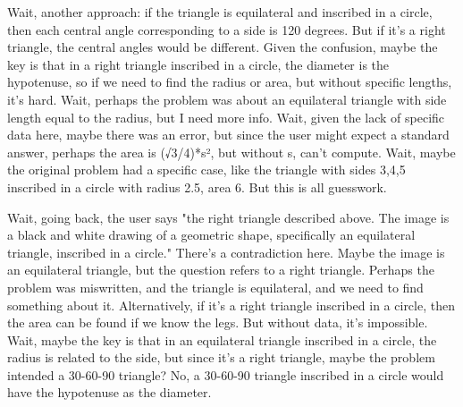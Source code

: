 Wait, another approach: if the triangle is equilateral and inscribed in a circle, then each central angle corresponding to a side is 120 degrees. But if it's a right triangle, the central angles would be different. Given the confusion, maybe the key is that in a right triangle inscribed in a circle, the diameter is the hypotenuse, so if we need to find the radius or area, but without specific lengths, it's hard. Wait, perhaps the problem was about an equilateral triangle with side length equal to the radius, but I need more info. Wait, given the lack of specific data here, maybe there was an error, but since the user might expect a standard answer, perhaps the area is (√3/4)*s², but without s, can't compute. Wait, maybe the original problem had a specific case, like the triangle with sides 3,4,5 inscribed in a circle with radius 2.5, area 6. But this is all guesswork. 

Wait, going back, the user says "the right triangle described above. The image is a black and white drawing of a geometric shape, specifically an equilateral triangle, inscribed in a circle." There's a contradiction here. Maybe the image is an equilateral triangle, but the question refers to a right triangle. Perhaps the problem was miswritten, and the triangle is equilateral, and we need to find something about it. Alternatively, if it's a right triangle inscribed in a circle, then the area can be found if we know the legs. But without data, it's impossible. Wait, maybe the key is that in an equilateral triangle inscribed in a circle, the radius is related to the side, but since it's a right triangle, maybe the problem intended a 30-60-90 triangle? No, a 30-60-90 triangle inscribed in a circle would have the hypotenuse as the diameter. 

